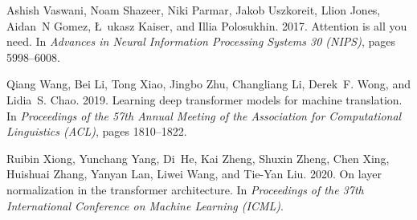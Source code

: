 \documentclass[11pt]{article}
\begin{document}
\begin{thebibliography}{16}
Ashish Vaswani, Noam Shazeer, Niki Parmar, Jakob Uszkoreit, Llion Jones,
  Aidan~N Gomez, \L~ukasz Kaiser, and Illia Polosukhin. 2017.
\newblock Attention is all you need.
\newblock In \emph{Advances in Neural Information Processing Systems 30
  (NIPS)}, pages 5998--6008.

Qiang Wang, Bei Li, Tong Xiao, Jingbo Zhu, Changliang Li, Derek~F. Wong, and
  Lidia~S. Chao. 2019.
\newblock Learning deep transformer models for machine translation.
\newblock In \emph{Proceedings of the 57th Annual Meeting of the Association
  for Computational Linguistics (ACL)}, pages 1810--1822.

Ruibin Xiong, Yunchang Yang, Di~He, Kai Zheng, Shuxin Zheng, Chen Xing,
  Huishuai Zhang, Yanyan Lan, Liwei Wang, and Tie-Yan Liu. 2020.
\newblock On layer normalization in the transformer architecture.
\newblock In \emph{Proceedings of the 37th International Conference on Machine
  Learning (ICML)}.

\end{thebibliography}
 
\end{document}

